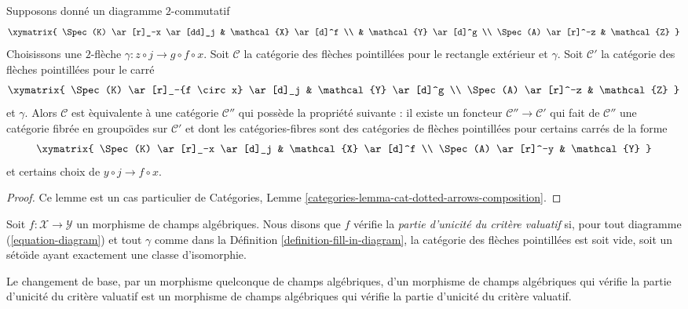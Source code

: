 \begin{lemma}
\label{lemma-cat-dotted-arrows-composition}
Supposons donn\'e un diagramme $2$-commutatif
$$
\xymatrix{
\Spec(K) \ar[r]_-x \ar[dd]_j & \mathcal{X} \ar[d]^f \\
& \mathcal{Y} \ar[d]^g \\
\Spec(A) \ar[r]^-z & \mathcal{Z}
}
$$
Choisissons une $2$-fl\`eche $\gamma : z \circ j \to g \circ f \circ x$.
Soit $\mathcal{C}$ la cat\'egorie des fl\`eches pointill\'ees pour
le rectangle ext\'erieur et $\gamma$. Soit $\mathcal{C}'$ la
cat\'egorie des fl\`eches pointill\'ees pour le carr\'e
$$
\xymatrix{
\Spec(K) \ar[r]_-{f \circ x} \ar[d]_j & \mathcal{Y} \ar[d]^g \\
\Spec(A) \ar[r]^-z & \mathcal{Z}
}
$$
et $\gamma$. Alors $\mathcal{C}$ est \`equivalente \`a une cat\'egorie $\mathcal{C}''$ 
qui poss\`ede la propri\'et\'e suivante : il existe 
un foncteur $\mathcal{C}'' \to \mathcal{C}'$
qui fait de $\mathcal{C}''$ une cat\'egorie fibr\'ee en groupo\"\i des sur
$\mathcal{C}'$ et dont les cat\'egories-fibres sont des cat\'egories de fl\`eches pointill\'ees
pour certains carr\'es de la forme
$$
\xymatrix{
\Spec(K) \ar[r]_-x \ar[d]_j & \mathcal{X} \ar[d]^f \\
\Spec(A) \ar[r]^-y & \mathcal{Y}
}
$$
et certains choix de $y \circ j \to f \circ x$.
\end{lemma}

\begin{proof}
Ce lemme est un cas particulier de Cat\'egories, 
Lemme \ref{categories-lemma-cat-dotted-arrows-composition}.
\end{proof}

\begin{definition}
\label{definition-uniqueness}
Soit $f : \mathcal{X} \to \mathcal{Y}$ un morphisme de champs alg\'ebriques.
Nous disons que $f$ v\'erifie la {\it partie d'unicit\'e du crit\`ere valuatif}
si, pour tout diagramme (\ref{equation-diagram}) et tout $\gamma$
comme dans la D\'efinition \ref{definition-fill-in-diagram},
la cat\'egorie des fl\`eches pointill\'ees est soit vide, soit
un s\'eto\"\i de ayant exactement une classe d'isomorphie.
\end{definition}

\begin{lemma}
\label{lemma-base-change-uniqueness}
Le changement de base, par un morphisme quelconque de champs alg\'ebriques,
d'un morphisme de champs alg\'ebriques qui v\'erifie la
partie d'unicit\'e du crit\`ere valuatif est un morphisme de champs alg\'ebriques
qui v\'erifie la partie d'unicit\'e du crit\`ere valuatif.
\end{lemma}

